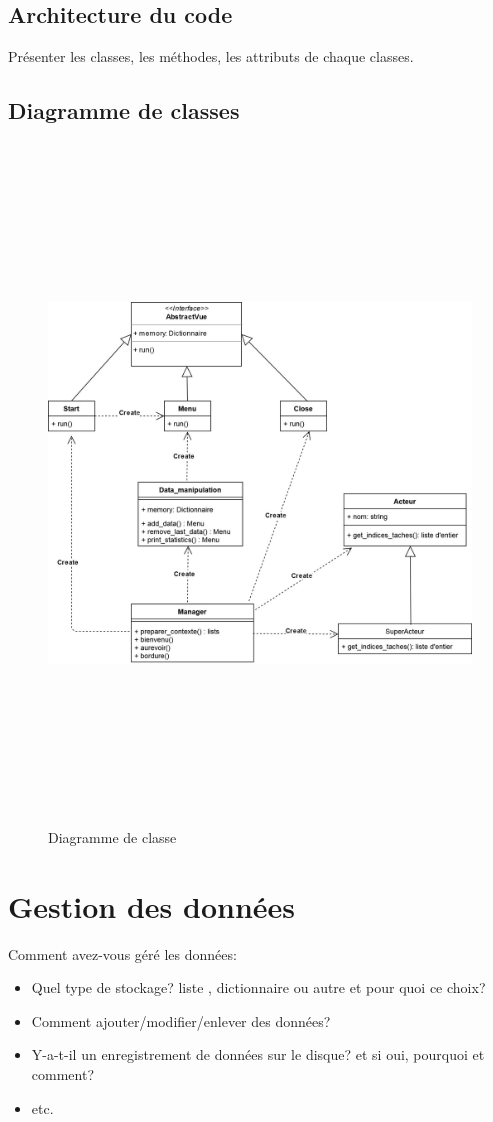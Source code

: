 \documentclass[french]{report}
\begin{document}
\newpage
\section{Architecture du code}
Présenter les classes, les méthodes, les attributs de chaque classes.

\section{Diagramme de classes}
\begin{figure}[!h]
\includegraphics[width=16cm, height=18cm]{diagramme_de_classes.jpg}
\caption{\label{fig:3} Diagramme de classe}
\end{figure}


\chapter{Gestion des données}
Comment avez-vous géré les données: 
\begin{itemize}
    \item Quel type de stockage? liste , dictionnaire ou autre et pour quoi ce choix?
    \item Comment ajouter/modifier/enlever des données?
    \item Y-a-t-il un enregistrement de données sur le disque? et si oui, pourquoi et comment?
    \item etc.
\end{itemize}
\end{document}
